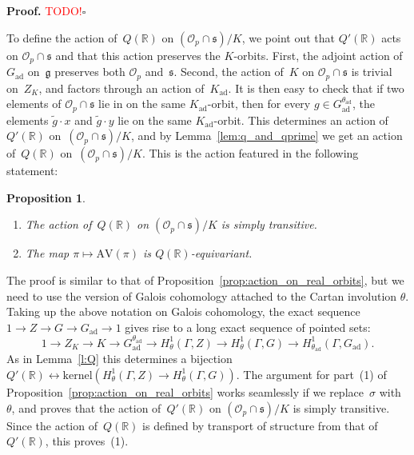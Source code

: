 \documentclass[10pt,leqno]{article}
\newtheorem{proposition}[equation]{Proposition}
\newcommand{\qed}{\hfill $\square$ \medskip}
\newenvironment{proof}[1][Proof]{\noindent\textbf{#1.} }{\qed}
\newcommand{\kernel}{\mathrm{kernel}}
\newcommand{\ad}{\mathrm{ad}}
\newcommand{\Gad}{G_\mathrm{ad}}
\newcommand{\Kad}{K_\mathrm{ad}}
\renewcommand{\O}{\mathcal O}
\newcommand{\R}{\mathbb R}
\newcommand{\g}{\mathfrak g}
\newcommand{\s}{\mathfrak s}
\newcommand{\AV}{\mathrm{AV}}
\newcommand{\Op}{\O_p}
\begin{document}
\begin{proof} \textcolor{red}{TODO!}\end{proof}


To define the  action of~$Q(\R)$ on $(\Op \cap \s)/K$, we point out that $Q'(\R)$ acts on $\Op \cap \s$ and that this action preserves the $K$-orbits. First, the adjoint action of~$\Gad$ on~$\g$ preserves both $\Op$ and~$\s$. Second, the action of~$K$ on $\Op \cap \s$ is trivial on~$Z_K$, and factors through an action of~$\Kad$. It is then easy to check that if two elements of $\Op \cap \s$ lie in on the same $\Kad$-orbit, then for every $g \in \Gad^{\theta_{\ad}}$, the elements  $\tilde{g} \cdot x$ and $\tilde{g} \cdot y$ lie on the same $\Kad$-orbit. This determines an action of~$Q'(\R)$ on~$(\Op \cap \s)/K$, and by Lemma~\ref{lem:q_and_qprime} we get an action of~$Q(\R)$ on~$(\Op \cap \s)/K$. This is the action featured in the following statement:


\begin{proposition}\label{prop:action_on_K_orbits}
\begin{enumerate} 
\item The action of~$Q(\R)$ on $(\Op \cap \s)/K$ is simply transitive.
\item The map $\pi \mapsto \AV(\pi)$ is $Q(\R)$-equivariant.
\end{enumerate}
\end{proposition}

The proof is similar to that of Proposition~\ref{prop:action_on_real_orbits}, but we need to use the version of Galois cohomology attached to the Cartan involution $\theta$. Taking up the above notation on Galois cohomology, the exact sequence $1\rightarrow Z \rightarrow G \rightarrow \Gad\rightarrow 1$ gives rise to a long exact sequence of pointed sets:
\begin{equation} \label{long_ptset_theta}
1\rightarrow Z_K \rightarrow K \rightarrow \Gad^{\theta_{\ad}} \rightarrow H^1_\theta(\Gamma,Z)\rightarrow H^1_\theta(\Gamma,G)\rightarrow H^1_{\theta_{\ad}}(\Gamma,\Gad).
\end{equation}
As in Lemma~\ref{l:Q}  this determines a bijection $Q'(\R) \leftrightarrow \kernel(H^1_\theta(\Gamma,Z)\rightarrow H^1_{\theta}(\Gamma,G))$. The argument for part~(1) of Proposition~\ref{prop:action_on_real_orbits} works seamlessly if we replace~$\sigma$ with~$\theta$, and proves that the action of~$Q'(\R)$ on $(\Op \cap \s)/K$ is simply transitive. Since the action of~$Q(\R)$ is defined by transport of structure from that of~$Q'(\R)$, this proves~(1). 
\end{document}
